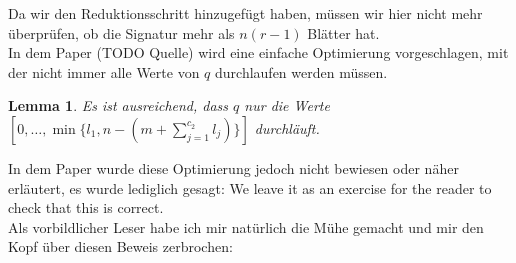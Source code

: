 \documentclass[a4paper,10pt,ngerman]{scrartcl}
\newtheorem{lemma}[satz]{Lemma}
\begin{document}
    Da wir den Reduktionsschritt hinzugefügt haben, müssen wir hier nicht mehr überprüfen, ob die Signatur mehr als $n (r - 1)$ Blätter hat. \\
    In dem Paper (TODO Quelle) wird eine einfache Optimierung vorgeschlagen, mit der nicht immer alle Werte von $q$ durchlaufen werden müssen.
    \begin{lemma}
        \label{lem:reader_1}
        Es ist ausreichend, dass $q$ nur die Werte $[0, \dots, \min\{l_1, n - \left(m + \sum^{c_2}_{j=1} l_j\right)\}]$ durchläuft.
    \end{lemma}
    In dem Paper wurde diese Optimierung jedoch nicht bewiesen oder näher erläutert, es wurde lediglich gesagt: \glqq We leave it as an exercise for the reader to check that this is correct.\grqq \\
    Als vorbildlicher Leser habe ich mir natürlich die Mühe gemacht und mir den Kopf über diesen Beweis zerbrochen:
\end{document}
